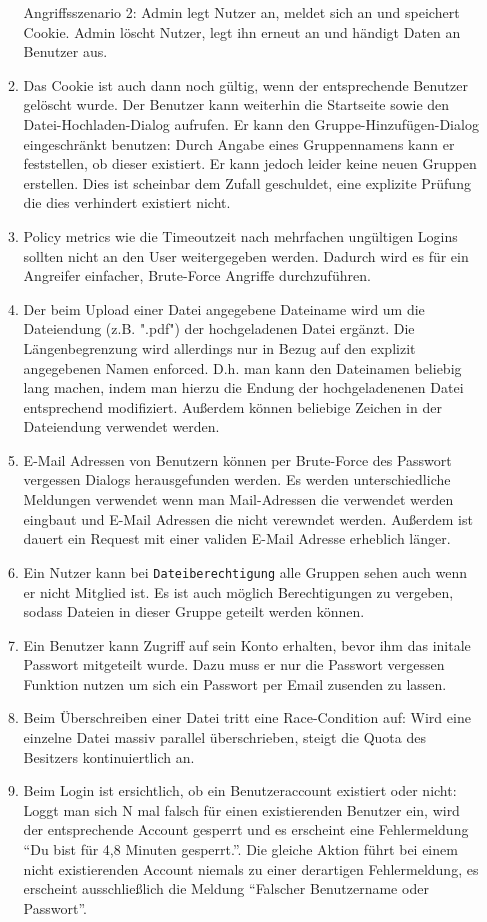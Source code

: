 \documentclass[12pt,DIV14,BCOR10mm,a4paper,parskip=half-,headsepline,headinclude,english,ngerman,bibliography=totocnumbered]{scrreprt}
\begin{document}
\begin{enumerate}
\begin{enumerate}
Angriffsszenario 2: Admin legt Nutzer an, meldet sich an und speichert Cookie. Admin löscht Nutzer, legt ihn erneut an und händigt Daten an Benutzer aus.
  \item Das Cookie ist auch dann noch gültig, wenn der entsprechende Benutzer gelöscht wurde. Der Benutzer kann weiterhin die Startseite sowie den Datei-Hochladen-Dialog aufrufen. Er kann den Gruppe-Hinzufügen-Dialog eingeschränkt benutzen: Durch Angabe eines Gruppennamens kann er feststellen, ob dieser existiert. Er kann jedoch leider keine neuen Gruppen erstellen. Dies ist scheinbar dem Zufall geschuldet, eine explizite Prüfung die dies verhindert existiert nicht.
  \item Policy metrics wie die Timeoutzeit nach mehrfachen ungültigen Logins sollten nicht an den User weitergegeben werden. Dadurch wird es für ein Angreifer einfacher, Brute-Force Angriffe durchzuführen. \autocite[Loc. 5087]{book:wahh}
  \item Der beim Upload einer Datei angegebene Dateiname wird um die Dateiendung (z.B. ".pdf") der hochgeladenen Datei ergänzt. Die Längenbegrenzung wird allerdings nur in Bezug auf den explizit angegebenen Namen enforced. D.h. man kann den Dateinamen beliebig lang machen, indem man hierzu die Endung der hochgeladenenen Datei entsprechend modifiziert. Außerdem können beliebige Zeichen in der Dateiendung verwendet werden.
  \item E-Mail Adressen von Benutzern können per Brute-Force des Passwort vergessen Dialogs herausgefunden werden. Es werden unterschiedliche Meldungen verwendet wenn man Mail-Adressen die verwendet werden eingbaut und E-Mail Adressen die nicht verewndet werden. Außerdem ist dauert ein Request mit einer validen E-Mail Adresse erheblich länger.
  \item Ein Nutzer kann bei \texttt{Dateiberechtigung} alle Gruppen sehen auch wenn er nicht Mitglied ist. Es ist auch möglich Berechtigungen zu vergeben, sodass Dateien in dieser Gruppe geteilt werden können.
\item Ein Benutzer kann Zugriff auf sein Konto erhalten, bevor ihm das initale Passwort mitgeteilt wurde. Dazu muss er nur die Passwort vergessen Funktion nutzen um sich ein Passwort per Email zusenden zu lassen.
\item Beim Überschreiben einer Datei tritt eine Race-Condition auf: Wird eine einzelne Datei massiv parallel überschrieben, steigt die Quota des Besitzers kontinuiertlich an.
\item Beim Login ist ersichtlich, ob ein Benutzeraccount existiert oder nicht: Loggt man sich N mal falsch für einen existierenden Benutzer ein, wird der entsprechende Account gesperrt und es erscheint eine Fehlermeldung \enquote{Du bist für 4,8 Minuten gesperrt.}. Die gleiche Aktion führt bei einem nicht existierenden Account niemals zu einer derartigen Fehlermeldung, es erscheint ausschließlich die Meldung \enquote{Falscher Benutzername oder Passwort}.

\end{enumerate}
\end{enumerate}
\end{document}
